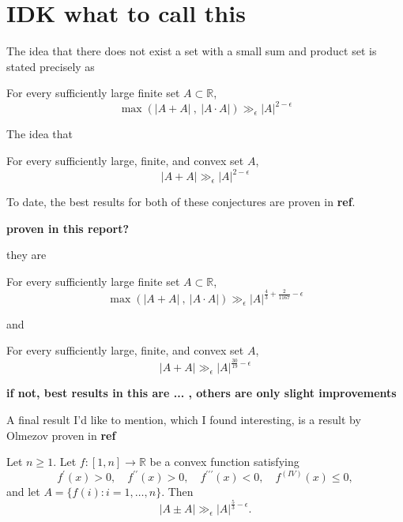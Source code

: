 \documentclass[12pt]{amsart}
\begin{document}
\section{ \textbf{IDK what to call this}}
The idea that there does not exist a set with a small sum and product set is
stated precisely as
\begin{conjecture}
For every sufficiently large finite set \(A \subset \mathbb{R} \),
\[
    \max \left( \left\lvert A+A \right\rvert ~,~ \left\lvert A \cdot A \right\rvert  \right) \gg_{\epsilon}  \left\lvert A \right\rvert^{2-\epsilon}
\]
\end{conjecture}

The idea that 

\begin{conjecture}
    For every sufficiently large, finite, and convex set \(A\),
    \[
        \left\lvert A+A \right\rvert \gg_{\epsilon}  \left\lvert A \right\rvert ^{2-\epsilon}
    \]
\end{conjecture}

To date, the best results for both of these conjectures are proven in \textbf{ref}.

\textbf{proven in this report?}

they are
\begin{theorem}
    For every sufficiently large finite set \(A \subset \mathbb{R} \),
    \[
        \max \left( \left\lvert A+A \right\rvert ~,~ \left\lvert A \cdot A \right\rvert  \right) \gg_{\epsilon}   \left\lvert A \right\rvert^{\frac{4}{3} + \frac{2}{1167} - \epsilon}
    \]
\end{theorem}

and

\begin{theorem}
    For every sufficiently large, finite, and convex set \(A\),
    \[
        \left\lvert A+A \right\rvert \gg_{\epsilon}  \left\lvert A \right\rvert ^{\frac{30}{19} - \epsilon }
    \]
\end{theorem}

\textbf{if not, best results in this are ... , others are only slight improvements}

A final result I'd like to mention, which I found interesting, is a result by Olmezov
proven in \textbf{ref}

\begin{theorem}
    Let \(n \geq 1\). Let \(f: [1,n]\to \mathbb{R} \) be a convex function satisfying
    \[
    f^{\prime}(x)>0, \quad f^{\prime \prime}(x)>0, \quad f^{\prime \prime \prime}(x)<0, \quad f^{(I V)}(x) \leq 0,
    \]
    and let \(A=\{f(i): i=1, \ldots, n\}\). Then
    \[
        \left\lvert A \pm A \right\rvert \gg_{\epsilon} \left\lvert A \right\rvert ^{\frac{5}{3} - \epsilon}
    .\]
\end{theorem}
\end{document}
